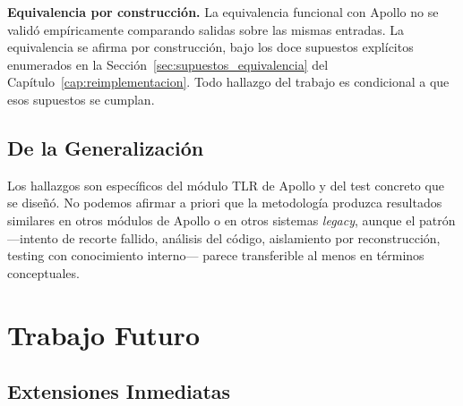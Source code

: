 \textbf{Equivalencia por construcción.} La equivalencia funcional con Apollo no se validó empíricamente comparando salidas sobre las mismas entradas. La equivalencia se afirma por construcción, bajo los doce supuestos explícitos enumerados en la Sección~\ref{sec:supuestos_equivalencia} del Capítulo~\ref{cap:reimplementacion}. Todo hallazgo del trabajo es condicional a que esos supuestos se cumplan.

\subsection{De la Generalización}

Los hallazgos son específicos del módulo TLR de Apollo y del test concreto que se diseñó. No podemos afirmar a priori que la metodología produzca resultados similares en otros módulos de Apollo o en otros sistemas \textit{legacy}, aunque el patrón ---intento de recorte fallido, análisis del código, aislamiento por reconstrucción, testing con conocimiento interno--- parece transferible al menos en términos conceptuales.

\section{Trabajo Futuro}

\subsection{Extensiones Inmediatas}
\label{sec:trabajo_futuro_inmediato}

